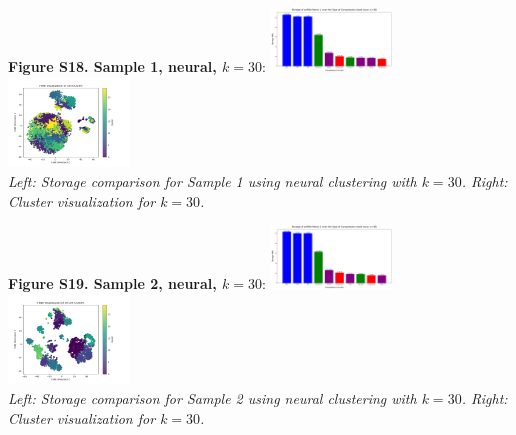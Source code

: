 \documentclass[unnumsec,webpdf,contemporary,large]{oup-authoring-template}
\begin{document}
\textbf{Figure S18. Sample 1, neural, $k=30$}:
\newline
\includegraphics[width=0.24\textwidth]{compressed/neural/sample1/k30/storage_comparisons.png}
\includegraphics[width=0.24\textwidth]{compressed/neural/sample1/k30/clusters.png}\\
\textit{Left: Storage comparison for Sample 1 using neural clustering with $k=30$. Right: Cluster visualization for $k=30$.}

\textbf{Figure S19. Sample 2, neural, $k=30$}:
\newline
\includegraphics[width=0.24\textwidth]{compressed/neural/sample2/k30/storage_comparisons.png}
\includegraphics[width=0.24\textwidth]{compressed/neural/sample2/k30/clusters.png}\\
\textit{Left: Storage comparison for Sample 2 using neural clustering with $k=30$. Right: Cluster visualization for $k=30$.}
\end{document}
